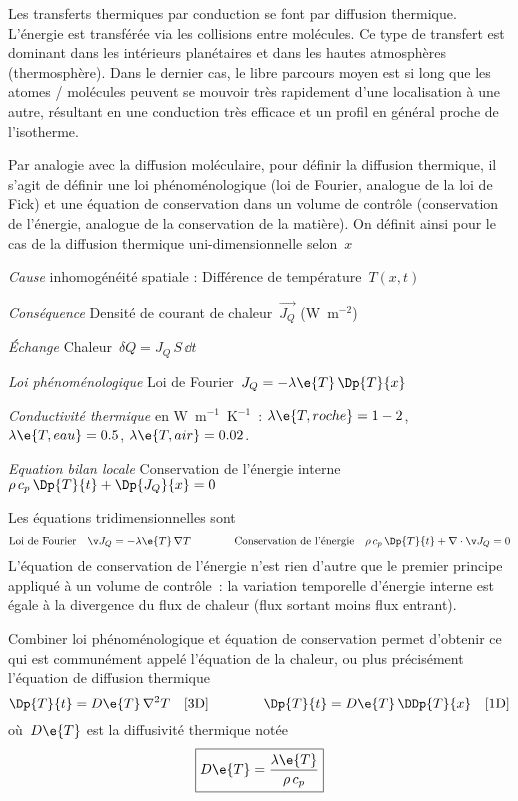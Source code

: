 \sk
Les transferts thermiques par conduction se font par diffusion thermique. L'énergie est transférée via les collisions entre molécules. Ce type de transfert est dominant dans les intérieurs planétaires et dans les hautes atmosphères (thermosphère). Dans le dernier cas, le libre parcours moyen est si long que les atomes / molécules peuvent se mouvoir très rapidement d'une localisation à une autre, résultant en une conduction très efficace et un profil en général proche de l'isotherme.

\sk
Par analogie avec la diffusion moléculaire, pour définir la diffusion thermique, il s'agit de définir une loi phénoménologique (loi de Fourier, analogue de la loi de Fick) et une équation de conservation dans un volume de contrôle (conservation de l'énergie, analogue de la conservation de la matière). On définit ainsi pour le cas de la diffusion thermique uni-dimensionnelle selon~$x$
\begin{citemize}
\item \textit{Cause} inhomogénéité spatiale : Différence de température~$T(x,t)$
\item \textit{Conséquence} Densité de courant de chaleur~$\vec{J_Q}$ (W~m$^{-2}$)
\item \textit{\'Echange} Chaleur~$\delta Q = J_Q \, S \, \dd t$
\item \textit{Loi phénoménologique} Loi de Fourier~$J_Q = - \lambda\e{T} \, \Dp{T}{x}$
\item \textit{Conductivité thermique} en W~m$^{-1}$~K$^{-1}$~: $\lambda\e{T,roche} = 1-2$, $\lambda\e{T,eau} = 0.5$, $\lambda\e{T,air} = 0.02$.
\item \textit{Equation bilan locale} Conservation de l'énergie interne~$ \rho \, c_p \, \Dp{T}{t} + \Dp{J_Q}{x} = 0 $
\end{citemize}

\sk
Les équations tridimensionnelles sont
\[  
\textrm{Loi de Fourier} \quad \vec{J_Q} = - \lambda\e{T} \, \nabla T 
\qquad \qquad
\textrm{Conservation de l'énergie} \quad \rho \, c_p \, \Dp{T}{t} + \nabla \cdot \vec{J_Q} = 0
\]
\noindent L'équation de conservation de l'énergie n'est rien d'autre que le premier principe appliqué à un volume de contrôle~: la variation temporelle d'énergie interne est égale à la divergence du flux de chaleur (flux sortant moins flux entrant).

\sk
Combiner loi phénoménologique et équation de conservation permet d'obtenir ce qui est communément appelé l'équation de la chaleur, ou plus précisément l'équation de diffusion thermique
\[ \Dp{T}{t} = D\e{T} \, \nabla^2 T \quad \textrm{[3D]} \qquad \qquad \Dp{T}{t} = D\e{T} \, \DDp{T}{x} \quad \textrm{[1D]} \]
\noindent où~$D\e{T}$ est la diffusivité thermique notée
\[ \boxed{ D\e{T} = \frac{\lambda\e{T}}{\rho \, c_p} } \]

